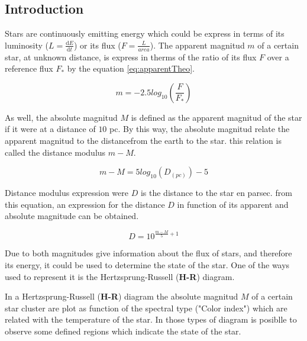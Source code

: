 \documentclass[twoside]{article}
\begin{document}
	\begin{multicols}{2} %

		\section{Introduction} %

			Stars are continuously emitting energy which could be express in terms of its luminosity ($L = \frac{\mathrm{d} E}{\mathrm{d} t}$) or its flux ($F = \frac{L}{area}$). The apparent magnitud $m$ of a certain star, at unknown distance, is express in therms of the ratio of its flux $F$ over a reference flux $F_*$ by the equation \ref{eq:apparentTheo}.

				\begin{equation}
					m = -2.5 log_{10} \left(\frac{F}{F_*} \right)
					\label{eq:apparentTheo}
				\end{equation}

			As well, the absolute magnitud $M$ is defined as the apparent magnitud of the star if it were at a distance of $10$ pc. By this way, the absolute magnitud relate the apparent magnitud to the distancefrom the earth to the star. this relation is called the distance modulus $m-M$.

				\begin{equation}
					m-M = 5 log_{10} (D_{(pc)})-5
				\end{equation}

			Distance modulus expression were $D$ is the distance to the star en parsec. from this equation, an expression for the distance $D$ in function of its apparent and absolute magnitude can be obtained.

				\begin{equation}
					D = 10^{\frac{m-M}{5} +1}
					\label{eq:distanceTheo}
				\end{equation}

			Due to both magnitudes give information about the flux of stars, and therefore its energy, it could be used to determine the state of the star. One of the ways used to represent it is the Hertzsprung-Russell (\textbf{H-R}) diagram.

			In a Hertzsprung-Russell (\textbf{H-R}) diagram the absolute magnitud $M$ of a certain star cluster are plot as function of the spectral type ("Color index") which are related with the temperature of the star. In those types of diagram is posiblle to observe some defined regions which indicate the state of the star. 


\end{multicols}
\end{document}
